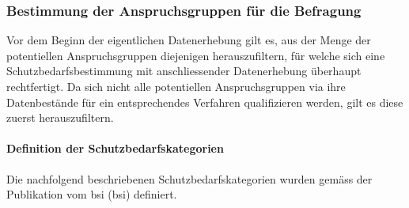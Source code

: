 \documentclass[../../main.tex]{subfiles}
\begin{document}
\subsubsection{Bestimmung der Anspruchsgruppen für die Befragung}


\begin{sloppypar}
Vor dem Beginn der eigentlichen Datenerhebung gilt es, aus der Menge der potentiellen Anspruchsgruppen diejenigen herauszufiltern, für welche sich eine  Schutzbedarfsbestimmung mit anschliessender Datenerhebung überhaupt rechtfertigt. Da sich nicht alle potentiellen Anspruchsgruppen via ihre Datenbestände für ein entsprechendes Verfahren qualifizieren werden, gilt es diese zuerst herauszufiltern. 
\end{sloppypar}

\paragraph*{Definition der Schutzbedarfskategorien}\mbox{}
\label{Schutzbedarfskategorien}

\begin{sloppypar}
Die nachfolgend beschriebenen Schutzbedarfskategorien wurden gemäss der Publikation  vom \acrlong{bsi} (\acrshort{bsi}) definiert. 
\end{sloppypar}
\end{document}
